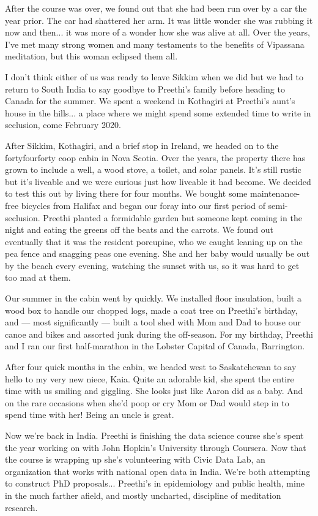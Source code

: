 \documentclass{article}
\begin{document}
After the course was over, we found out that she had been run over by a car the year
prior. The car had shattered her arm. It was little wonder she was rubbing it now and
then... it was more of a wonder how she was alive at all. Over the years, I've
met many strong women and many testaments to the benefits of Vipassana meditation,
but this woman eclipsed them all.

I don't think either of us was ready to leave Sikkim when we did but we had to return
to South India to say goodbye to Preethi's family before heading to Canada for the
summer. We spent a weekend in Kothagiri at Preethi's aunt's house in the hills... a
place where we might spend some extended time to write in seclusion, come February 2020.

After Sikkim, Kothagiri, and a brief stop in Ireland, we headed on to the fortyfourforty coop cabin in Nova
Scotia. Over the years, the property there has grown to include a well, a wood stove,
a toilet, and solar panels. It's still rustic but it's liveable and we were curious
just how liveable it had become. We decided to test this out by living there for four
months. We bought some maintenance-free bicycles from Halifax and began our foray
into our first period of semi-seclusion. Preethi planted a formidable garden but
someone kept coming in the night and eating the greens off the beats and the
carrots. We found out eventually that it was the resident porcupine, who we caught
leaning up on the pea fence and snagging peas one evening. She and her baby would
usually be out by the beach every evening, watching the sunset with us, so it was hard to get too
mad at them.

Our summer in the cabin went by quickly. We installed floor insulation, built a wood
box to handle our chopped logs, made a coat tree on Preethi's birthday, and --- most
significantly --- built a tool shed with Mom and Dad to house our canoe and bikes and assorted junk
during the off-season. For my birthday, Preethi and I ran our first half-marathon in
the Lobster Capital of Canada, Barrington.

After four quick months in the cabin, we headed west to Saskatchewan to say hello to
my very new niece, Kaia. Quite an adorable kid, she spent the entire time with us
smiling and giggling. She looks just like Aaron did as a baby. And on the rare
occasions when she'd poop or cry Mom or Dad
would step in to spend time with her! Being an uncle is great.

Now we're back in India. Preethi is finishing the data science course she's spent the
year working on with John Hopkin's University through Coursera. Now that the course
is wrapping up she's volunteering with Civic Data Lab, an
organization that works with national open data in India. We're both attempting to
construct PhD proposals... Preethi's in epidemiology and public health, mine in the
much farther afield, and mostly uncharted, discipline of meditation research.
\end{document}
